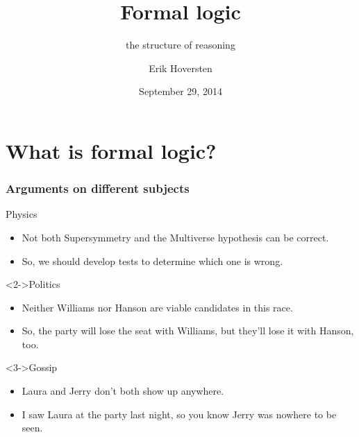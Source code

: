 \documentclass[10pt,letterpaper,xcolor=dvipsnames]{beamer}
\title{Formal logic}
\subtitle{the structure of reasoning}
\author[Hoversten]{Erik Hoversten}
\institute[lrp-f14]{Logic, reason, and persuasion: fall 2014 \\ Rutgers University}
\date[09/29/2014]{September 29, 2014}
\begin{document}
\begin{frame}
\titlepage
\end{frame}

\section{What is formal logic?}

\begin{frame}
\frametitle{Arguments on different subjects}

\begin{block}{Physics}
  \begin{itemize}
    \item Not both Supersymmetry and the Multiverse hypothesis can be correct.
    \item So, we should develop tests to determine which one is wrong.
  \end{itemize}
\end{block}

\begin{block}<2->{Politics}
  \begin{itemize}
    \item Neither Williams nor Hanson are viable candidates in this race.
    \item So, the party will lose the seat with Williams, but they'll lose it with Hanson, too.
  \end{itemize}
\end{block}

\begin{block}<3->{Gossip}
  \begin{itemize}
    \item Laura and Jerry don't both show up anywhere.
    \item I saw Laura at the party last night, so you know Jerry was nowhere to be seen.
  \end{itemize}
\end{block}

\end{frame}
\end{document}
